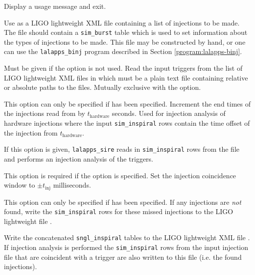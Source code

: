 \begin{entry}
\begin{entry}
\item[\option{--help}]
Display a usage message and exit.

\item[\option{--injection-file} \parm{injfile name}]
Use  as a LIGO lightweight XML file containing a list of
injections to be made. The file should contain a \verb+sim_burst+ table
which is used to set information about the types of injections to be made.
This file may be constructed by hand, or one can use the
\verb+lalapps_binj+ program described in Section
\ref{program:lalapps-binj}.   

\item[\option{--input}~\parm{inputfile} ]
Must be given if the  option is not used. Read the input triggers from the list of
LIGO lightweight XML files in  which must be a plain text
file containing relative or absolute paths to the files.  Mutually exclusive
with the  option.

\item[\option{--hardware-injections}~\parm{$t_\mathrm{hardware}$}]
This option can only be specified if  has been specified.
Increment the end times of the injections read from  by
$t_\mathrm{hardware}$ seconds. Used for injection analysis of hardware
injections where the input \verb$sim_inspiral$ rows contain the time offset of
the injection from  $t_\mathrm{hardware}$.

\item[\option{--injection-file} \parm{injfile}] 
If this option is given, \verb$lalapps_sire$ reads in \verb$sim_inspiral$ rows from the file
 and performs an injection analysis of the triggers.

\item[\option{--injection-coincidence} \parm{$t_\mathrm{inj}$}]
This option is required if
the  option is specified. Set the injection
coincidence window to $\pm t_\mathrm{inj}$ milliseconds.

\item[\option{--missed-injections} \parm{file}] 
This option can only be specified if  has been specified. 
If any injections are \emph{not} found, write the \verb$sim_inspiral$ rows for these missed injections to the LIGO lightweight file .

\item[\option{--output} \parm{outfile}]  
Write the concatenated
\verb$sngl_inspiral$ tables to the LIGO lightweight XML file .
If injection analysis is performed the \verb$sim_inspiral$ rows from the input
injection file that are coincident with a trigger are also written to this
file (i.e. the found injections).


\end{entry}
\end{entry}
